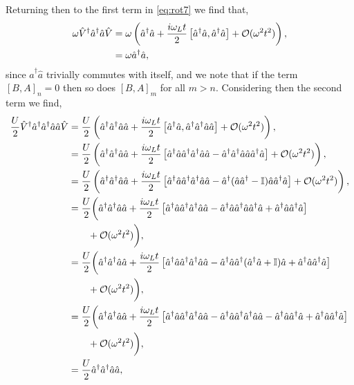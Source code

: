 Returning then to the first term in \cref{eq:rot7} we find that,
\begin{align}
	\omega\hat{V}^{\dagger}\hat{a}^{\dagger}\hat{a}\hat{V} &= \omega\left(\hat{a}^{\dagger}\hat{a} + \frac{i\omega_{L}t}{2}\left[\hat{a}^{\dagger}\hat{a}, \hat{a}^{\dagger}\hat{a}\right] + \mathcal{O}(\omega^{2}t^{2})\right), \notag \\
	&= \omega\hat{a}^{\dagger}\hat{a},
	\label{eq:rot13}
\end{align}
since \(\hat{a}^{\dagger}\hat{a}\) trivially commutes with itself, and we note that if the term \([B,A]_{n} = 0\) then so does \([B,A]_{m}\) for all \(m > n\). Considering then the second term we find,
\begin{align}
	\frac{U}{2}\hat{V}^{\dagger}\hat{a}^{\dagger}\hat{a}^{\dagger}\hat{a}\hat{a}\hat{V} &= \frac{U}{2} \left( \hat{a}^{\dagger}\hat{a}^{\dagger}\hat{a}\hat{a} + \frac{i\omega_{L}t}{2}\left[\hat{a}^{\dagger}\hat{a}, \hat{a}^{\dagger}\hat{a}^{\dagger}\hat{a}\hat{a}\right] + \mathcal{O}(\omega^{2}t^{2}) \right), \notag \\
	&= \frac{U}{2}\left( \hat{a}^{\dagger}\hat{a}^{\dagger}\hat{a}\hat{a} + \frac{i\omega_{L}t}{2}\left[\hat{a}^{\dagger}\hat{a}\hat{a}^{\dagger}\hat{a}^{\dagger}\hat{a}\hat{a} - \hat{a}^{\dagger}\hat{a}^{\dagger}\hat{a}\hat{a}\hat{a}^{\dagger}\hat{a} \right] + \mathcal{O}(\omega^{2}t^{2}) \right), \notag \\
	&= \frac{U}{2}\left( \hat{a}^{\dagger}\hat{a}^{\dagger}\hat{a}\hat{a} + \frac{i\omega_{L}t}{2}\left[\hat{a}^{\dagger}\hat{a}\hat{a}^{\dagger}\hat{a}^{\dagger}\hat{a}\hat{a} - \hat{a}^{\dagger}(\hat{a}\hat{a}^{\dagger} - \mathbb{I})\hat{a}\hat{a}^{\dagger}\hat{a} \right] + \mathcal{O}(\omega^{2}t^{2}) \right), \notag \\
	&= \frac{U}{2}\biggl( \hat{a}^{\dagger}\hat{a}^{\dagger}\hat{a}\hat{a} + \frac{i\omega_{L}t}{2}\left[\hat{a}^{\dagger}\hat{a}\hat{a}^{\dagger}\hat{a}^{\dagger}\hat{a}\hat{a} - \hat{a}^{\dagger}\hat{a}\hat{a}^{\dagger}\hat{a}\hat{a}^{\dagger}\hat{a} + \hat{a}^{\dagger}\hat{a}\hat{a}^{\dagger}\hat{a} \right] \notag \\ 
	&\qquad + \mathcal{O}(\omega^{2}t^{2}) \biggr), \notag \\
	&= \frac{U}{2}\biggl( \hat{a}^{\dagger}\hat{a}^{\dagger}\hat{a}\hat{a} + \frac{i\omega_{L}t}{2}\left[\hat{a}^{\dagger}\hat{a}\hat{a}^{\dagger}\hat{a}^{\dagger}\hat{a}\hat{a} - \hat{a}^{\dagger}\hat{a}\hat{a}^{\dagger}(\hat{a}^{\dagger}\hat{a} + \mathbb{I})\hat{a} + \hat{a}^{\dagger}\hat{a}\hat{a}^{\dagger}\hat{a} \right] \notag \\ 
	&\qquad + \mathcal{O}(\omega^{2}t^{2}) \biggr), \notag \\
	&= \frac{U}{2}\biggl( \hat{a}^{\dagger}\hat{a}^{\dagger}\hat{a}\hat{a} + \frac{i\omega_{L}t}{2}\left[\hat{a}^{\dagger}\hat{a}\hat{a}^{\dagger}\hat{a}^{\dagger}\hat{a}\hat{a} - \hat{a}^{\dagger}\hat{a}\hat{a}^{\dagger}\hat{a}^{\dagger}\hat{a}\hat{a} - \hat{a}^{\dagger}\hat{a}\hat{a}^{\dagger}\hat{a} + \hat{a}^{\dagger}\hat{a}\hat{a}^{\dagger}\hat{a} \right] \notag \\ 
	&\qquad + \mathcal{O}(\omega^{2}t^{2}) \biggr), \notag \\
	&= \frac{U}{2}\hat{a}^{\dagger}\hat{a}^{\dagger}\hat{a}\hat{a},
	\label{eq:rot14}
\end{align}
